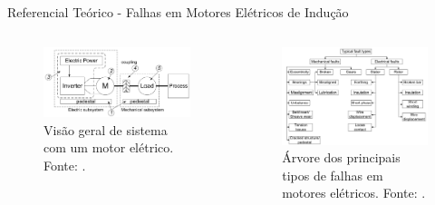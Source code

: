 \documentclass[aspectratio=169]{beamer}
\begin{document}

\begin{frame}{Referencial Teórico - Falhas em Motores Elétricos de Indução}
	\begin{columns}
    	\begin{column}{0.50\textwidth}
			\begin{figure}[HT]
				\begin{center}
					\captionsetup{justification=justified}
					\includegraphics[scale=.25]{../referencial/img/motor_system_rilski_p2.png}
					\caption{Visão geral de sistema com um motor elétrico. \newline
					Fonte: .} 
					\label{fig:motor_system_rilski_p2}
				\end{center}
			\end{figure}
     	\end{column}
		
		\begin{column}{0.5\textwidth}
			\begin{figure}[HT]
				\begin{center}
					\captionsetup{justification=justified}
					\includegraphics[scale=.27]{../referencial/img/faults_rilski_p77.png}
					\caption{Árvore dos principais tipos de \newline
					falhas em motores elétricos. \newline
					Fonte: .} 
					\label{fig:faults_rilski_p77}
				\end{center}
			\end{figure}
	 	\end{column}
	 \end{columns}
\end{frame}
\end{document}

